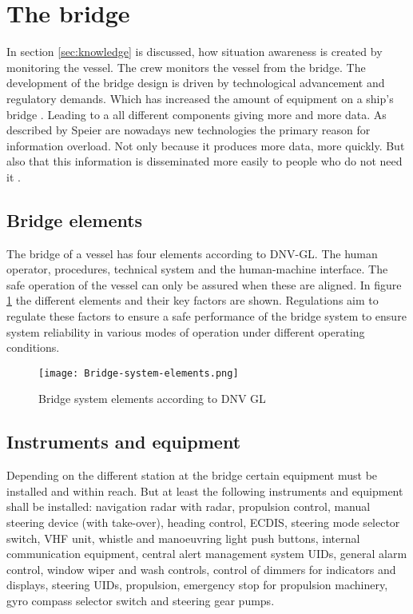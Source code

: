 \section{The bridge}
In section \ref{sec:knowledge} is discussed, how situation awareness is created by monitoring the vessel. The crew monitors the vessel from the bridge. The development of the bridge design is driven by technological advancement and regulatory demands. Which has increased the amount of equipment on a ship's bridge \cite{Lamme2017}. Leading to a all different components giving more and more data. As described by Speier are nowadays new technologies the primary reason for information overload. Not only because it produces more data, more quickly. But also that this information is disseminated more easily to people who do not need it \cite{Speier1999}. 

\subsection{Bridge elements}
The bridge of a vessel has four elements according to DNV-GL. The human operator, procedures, technical system and the human-machine interface. The safe operation of the vessel can only be assured when these are aligned. In figure \ref{fig:Bridge-system-elements} the different elements and their key factors are shown. Regulations aim to regulate these factors to ensure a safe performance of the bridge system to ensure system reliability in various modes of operation under different operating conditions. \cite{DNVGL2011}

\begin{figure}[hb]
	\centering
	\texttt{[image: Bridge-system-elements.png]}
	\caption{Bridge system elements according to DNV GL}
	\label{fig:Bridge-system-elements}
\end{figure}

\subsection{Instruments and equipment}
Depending on the different station at the bridge certain equipment must be installed and within reach. But at least the following instruments and equipment shall be installed: navigation radar with radar, propulsion control, manual steering device (with take-over), heading control, \ac{ECDIS}, steering mode selector switch, \ac{VHF} unit, whistle and manoeuvring light push buttons, internal communication equipment, central alert management system \ac{UID}s, general alarm control, window wiper and wash controls, control of dimmers for indicators and displays, steering \ac{UID}s, propulsion, emergency stop for propulsion machinery, gyro compass selector switch and steering gear pumps.

